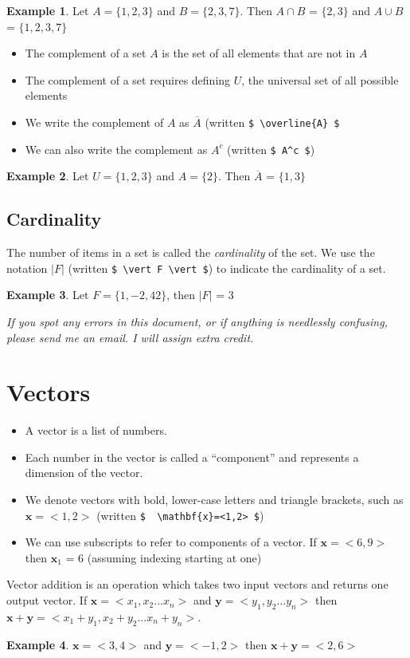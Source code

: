 \documentclass[]{article}
\theoremstyle{definition}
\newtheorem{exmp}{Example}[section]
\begin{document}
\begin{exmp}
Let $ A= \{1, 2, 3\}$ and $B = \{2,3,7\}$. Then $A \cap B$ = $\{2, 3\}$ and $A \cup B$ = $\{1,2, 3, 7\}$
\end{exmp}

\begin{itemize}
\item The complement of a set $A$ is the set of all elements that are not in $A$
\item The complement of a set requires defining $U$, the universal set of all possible elements
\item We write the complement of $A$ as $\overline{A}$ (written \verb|$ \overline{A} $| 
\item We can also write the complement as $A^c$  (written \verb|$ A^c $|)
\end{itemize}

\begin{exmp}
Let $ U= \{1, 2, 3\}$ and $A = \{2\}$. Then $\overline{A}$ = $\{1, 3\}$ 
\end{exmp}

\subsection{Cardinality}

The number of items in a set is called the \textit{cardinality} of the set. We use the notation $\vert F \vert$ (written \verb|$ \vert F \vert $|) to indicate the cardinality of a set.

\begin{exmp}
Let $ F = \{1, -2, 42 \}$, then $\vert F \vert$ = 3
\end{exmp}

\textit{If you spot any errors in this document, or if anything is needlessly confusing, please send me an email. I will assign extra credit.}

\section{Vectors}

\begin{itemize}
\item A vector is a list of numbers. 
\item Each number in the vector is called a ``component'' and represents a dimension of the vector. 
\item We denote vectors with bold, lower-case letters and triangle brackets, such as $ \mathbf{x}=<1,2> $ (written \verb|$  \mathbf{x}=<1,2> $|)
\item We can use subscripts to refer to components of a vector. If $\mathbf{x}=<6,9>$ then $\mathbf{x}_1$ = 6 (assuming indexing starting at one)
\end{itemize}

Vector addition is an operation which takes two input vectors and returns one output vector. If  $\mathbf{x}=<x_1, x_2 ... x_n>$ and $\mathbf{y}=<y_1, y_2 ... y_n>$  then  $\mathbf{x}+\mathbf{y}=<x_1 + y_1, x_2 + y_2 ... x_n + y_n>$.

\begin{exmp}
$\mathbf{x}=<3,4>$ and $\mathbf{y}=<-1,2>$  then  $\mathbf{x}+\mathbf{y}=<2,6>$
\end{exmp}
\end{document}
